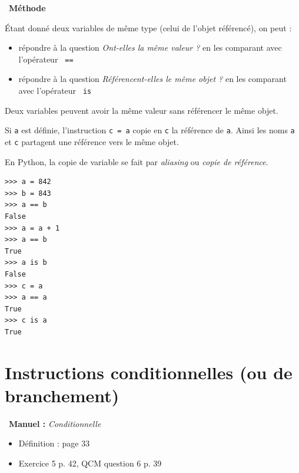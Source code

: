\documentclass[a4paper, french, 12pt]{article}  %
\newenvironment{methode}[1]
{\par \medskip    \noindent  
 \begin {bclogo}[arrondi =0.1,logo=\bcoutil, marge=4,noborder = true] {~\textbf{Méthode}   {\itshape #1} }  \par}
{
\end{bclogo}
 \par \bigskip }
\newenvironment{manuel}[1]
{\par \medskip  \noindent  
\begin{bclogo}[arrondi =0.1,   noborder = true, logo=\bcoeil, marge=4]{~\textbf{Manuel :}  {\itshape #1} }  \itshape \par}
{
\end{bclogo}
 \par \bigskip }
\begin{document}
\begin{methode}{}

Étant donné deux variables de même type (celui de l'objet référencé), on peut :

\begin{itemize}
	\item répondre à la question \og{} \textit{Ont-elles la même valeur ?} \fg{} en les comparant  avec l'opérateur \texttt{ == }
	\item répondre à la question \og{} \textit{Référencent-elles le même objet ?} \fg{} en les comparant  avec l'opérateur \texttt{ is }
\end{itemize}

Deux variables peuvent avoir la même valeur sans référencer le même objet.

Si \texttt{a} est définie, l'instruction \texttt{c = a}  copie en \texttt{c}  la référence de \texttt{a}. Ainsi les noms \texttt{a} et \texttt{c} partagent une référence vers le même objet. 

En Python, la copie de variable se fait par \textit{aliasing} ou \textit{copie de référence}.

\begin{lstlisting}[style=compil]
>>> a = 842
>>> b = 843
>>> a == b
False
>>> a = a + 1
>>> a == b
True
>>> a is b
False
>>> c = a 
>>> a == a
True
>>> c is a
True
\end{lstlisting}

\end{methode}




\section{Instructions conditionnelles  (ou de branchement)}

\begin{manuel}{Conditionnelle}
\begin{itemize}[label=]
 \item Définition  : page 33
 \item Exercice 5 p. 42, QCM question 6  p. 39
\end{itemize}
\end{manuel}
\end{document}
